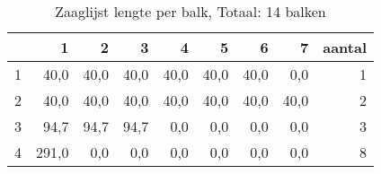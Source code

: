 \begin{table}[h!]
\centering
\caption{Zaaglijst lengte per balk, Totaal: 14 balken}
\begin{tabular}{lrrrrrrrr}
\toprule
{} &     1 &    2 &    3 &    4 &    5 &    6 &    7 &  aantal \\
\midrule
1 &  40,0 & 40,0 & 40,0 & 40,0 & 40,0 & 40,0 &  0,0 &       1 \\
2 &  40,0 & 40,0 & 40,0 & 40,0 & 40,0 & 40,0 & 40,0 &       2 \\
3 &  94,7 & 94,7 & 94,7 &  0,0 &  0,0 &  0,0 &  0,0 &       3 \\
4 & 291,0 &  0,0 &  0,0 &  0,0 &  0,0 &  0,0 &  0,0 &       8 \\
\bottomrule
\end{tabular}
\end{table}
